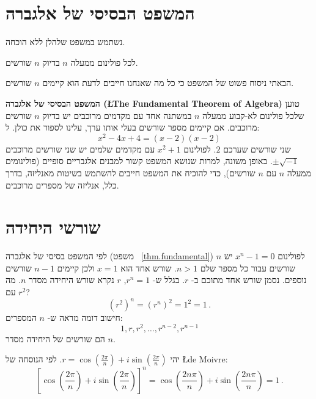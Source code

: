 
\newpage

\section{המשפט הבסיסי של אלגברה}\label{s.fundamental}

נשתמש במשפט שלהלן ללא הוכחה.

\begin{theorem}\label{thm.fundamental}
לכל פולינום ממעלה 
$n$
בדיוק 
$n$
שורשים.
\end{theorem}
הבאתי ניסוח פשוט של המשפט כי כל מה שאנחנו חייבים לדעת הוא קיימים
$n$
שורשים.

\begin{advanced}
\textbf{המשפט הבסיסי של אלגברה (\L{The Fundamental Theorem of Algebra})}
טוען שלכל פולינום לא-קבוע ממעלה 
$n$
במשתנה אחד עם מקדמים מרוכבים יש בדיוק 
$n$
שורשים מרוכבים. אם קיימים מספר שורשים בעלי אותו ערך, עלינו לספור את כולן. ל:
\[
x^2-4x+4=(x-2)(x-2)
\]
שני שורשים שערכם
$2$.
לפולינום 
$x^2+1$
עם מקדמים שלמים יש שני שורשים מרוכבים
$\pm\sqrt{-1}$.
באופן משונה, למרות שנושא המשפט קשור למבנים אלגבריים סופיים (פולינומים ממעלה
$n$
עם
$n$
שורשים), כדי להוכיח את המשפט חייבים להשתמש בשיטות מאנליזה, בדרך כלל, אנליזה של מספרים מרוכבים.
\end{advanced}


\section{שורשי היחידה}\label{s.roots}

לפי המשפט בסיסי של אלגברה (משפט~%
\ref{thm.fundamental})
לפולינום
$x^{n}-1=0$
יש 
$n$
שורשים עבור כל מספר שלם
$n>	 1$.
שורש אחד הוא
$x=1$
ולכן קיימים
$n-1$
שורשים נוספים. נסמן שורש אחד מתוכם ב-%
$r$.
בגלל ש-%
$r^{n}=1$,
$r$
נקרא שורש היחידה מסדר
$n$.
מה עם
$r^2$?
\[
(r^2)^n=(r^{n})^2=1^2=1\,.
\]
חישוב דומה מראה ש-%
$n$
המספרים:
\[
1, r, r^2, \ldots, r^{n-2}, r^{n-1}
\]
הם שורשים של היחידה מסדר
$n$.
\begin{advanced}
יהי
$r=\cos \left(\frac{2\pi}{n}\right) + i\sin  \left(\frac{2\pi}{n}\right)$.
לפי הנוסחה של
\L{de Moivre}:
\[
\left[\cos \left(\frac{2\pi}{n}\right) + i\sin  \left(\frac{2\pi}{n}\right)\right]^{n}=
\cos \left(\frac{2 n\pi}{n}\right) + i\sin  \left(\frac{2 n\pi}{n}\right)= 1\,.
\]
\vspace{-2ex}
\end{advanced}

